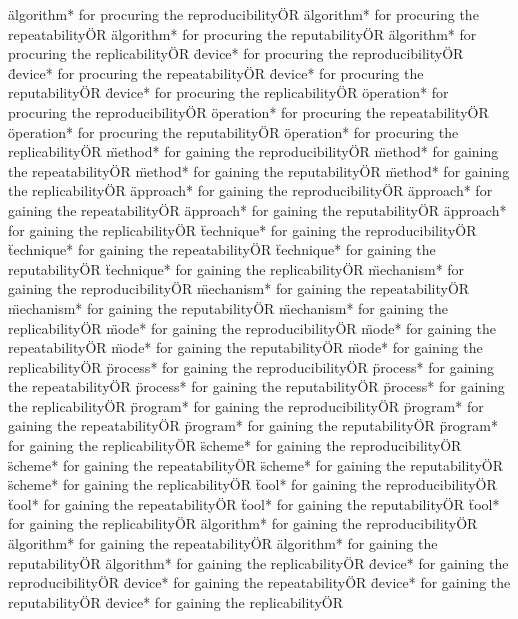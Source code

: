 \documentclass[
10pt, %
a4paper, %
oneside, %
headinclude,footinclude, %
BCOR5mm, %
]{scrartcl}
\begin{document}
\"algorithm* for procuring the reproducibility\" OR \"algorithm* for procuring the repeatability\" OR \"algorithm* for procuring the reputability\" OR \"algorithm* for procuring the replicability\" OR 
\"device* for procuring the reproducibility\" OR \"device* for procuring the repeatability\" OR \"device* for procuring the reputability\" OR \"device* for procuring the replicability\" OR 
\"operation* for procuring the reproducibility\" OR \"operation* for procuring the repeatability\" OR \"operation* for procuring the reputability\" OR \"operation* for procuring the replicability\" OR 
\"method* for gaining the reproducibility\" OR \"method* for gaining the repeatability\" OR \"method* for gaining the reputability\" OR \"method* for gaining the replicability\" OR 
\"approach* for gaining the reproducibility\" OR \"approach* for gaining the repeatability\" OR \"approach* for gaining the reputability\" OR \"approach* for gaining the replicability\" OR 
\"technique* for gaining the reproducibility\" OR \"technique* for gaining the repeatability\" OR \"technique* for gaining the reputability\" OR \"technique* for gaining the replicability\" OR 
\"mechanism* for gaining the reproducibility\" OR \"mechanism* for gaining the repeatability\" OR \"mechanism* for gaining the reputability\" OR \"mechanism* for gaining the replicability\" OR 
\"mode* for gaining the reproducibility\" OR \"mode* for gaining the repeatability\" OR \"mode* for gaining the reputability\" OR \"mode* for gaining the replicability\" OR 
\"process* for gaining the reproducibility\" OR \"process* for gaining the repeatability\" OR \"process* for gaining the reputability\" OR \"process* for gaining the replicability\" OR 
\"program* for gaining the reproducibility\" OR \"program* for gaining the repeatability\" OR \"program* for gaining the reputability\" OR \"program* for gaining the replicability\" OR 
\"scheme* for gaining the reproducibility\" OR \"scheme* for gaining the repeatability\" OR \"scheme* for gaining the reputability\" OR \"scheme* for gaining the replicability\" OR 
\"tool* for gaining the reproducibility\" OR \"tool* for gaining the repeatability\" OR \"tool* for gaining the reputability\" OR \"tool* for gaining the replicability\" OR 
\"algorithm* for gaining the reproducibility\" OR \"algorithm* for gaining the repeatability\" OR \"algorithm* for gaining the reputability\" OR \"algorithm* for gaining the replicability\" OR 
\"device* for gaining the reproducibility\" OR \"device* for gaining the repeatability\" OR \"device* for gaining the reputability\" OR \"device* for gaining the replicability\" OR 
\end{document}

